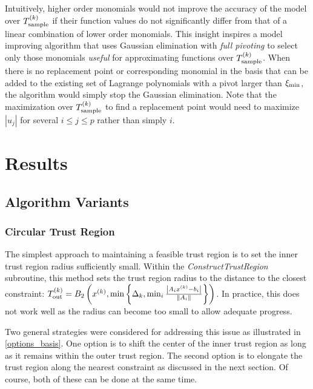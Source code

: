 Intuitively, higher order monomials would not improve the accuracy of the model over ${T_{\text{sample}}^{(k)}}$ 
if their function values do not significantly differ from that of a linear combination of lower order monomials.
This insight inspires a model improving algorithm that uses Gaussian elimination with {\em full pivoting}
to select only those monomials {\em useful} for approximating functions over ${T_{\text{sample}}^{(k)}}$.
When there is no replacement point or corresponding monomial in the basis that can be added to the existing set of Lagrange polynomials with a pivot larger than $\xi_{\text{min}}$,
the algorithm would simply stop the Gaussian elimination.
Note that the maximization over ${T_{\text{sample}}^{(k)}}$ to find a replacement point would need to maximize $|u_j|$ for several $i \le j \le p$ rather than simply $i$.


\section{Results}

\subsection{Algorithm Variants}

\subsubsection{Circular Trust Region}
The simplest approach to maintaining a feasible trust region is to set the inner trust region radius sufficiently small.
Within the \emph{ConstructTrustRegion} subroutine, this method sets the trust region radius to the distance to the closest constraint:
${T_{\text{out}}^{(k)}} = B_2\left(x^{(k)}, \min\left\{\Delta_k, \min_{i}\frac{\left|A_ix^{(k)} - b_i\right|}{\left\|A_i\right\|} \right\}\right)$.
In practice, this does not work well as the radius can become too small to allow adequate progress.

Two general strategies were considered for addressing this issue as illustrated in \cref{options_basis}.
One option is to shift the center of the inner trust region as long as it remains within the outer trust region.
The second option is to elongate the trust region along the nearest constraint as discussed in the next section.
Of course, both of these can be done at the same time.


